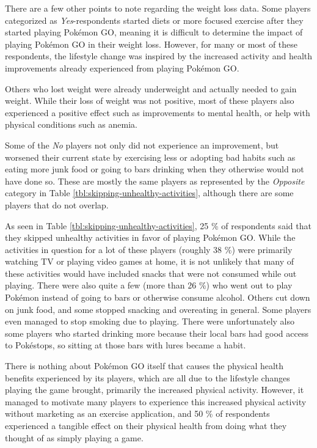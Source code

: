 There are a few other points to note regarding the weight loss data. Some players categorized as \emph{Yes}-respondents started diets or more focused exercise after they started playing Pokémon GO, meaning it is difficult to determine the impact of playing Pokémon GO in their weight loss. However, for many or most of these respondents, the lifestyle change was inspired by the increased activity and health improvements already experienced from playing Pokémon GO.

Others who lost weight were already underweight and actually needed to gain weight. While their loss of weight was not positive, most of these players also experienced a positive effect such as improvements to mental health, or help with physical conditions such as anemia.

Some of the \emph{No} players not only did not experience an improvement, but worsened their current state by exercising less or adopting bad habits such as eating more junk food or going to bars drinking when they otherwise would not have done so. These are mostly the same players as represented by the \emph{Opposite} category in Table \ref{tbl:skipping-unhealthy-activities}, although there are some players that do not overlap.

As seen in Table \ref{tbl:skipping-unhealthy-activities}, 25 \% of respondents said that they skipped unhealthy activities in favor of playing Pokémon GO. While the activities in question for a lot of these players (roughly 38 \%) were primarily watching TV or playing video games at home, it is not unlikely that many of these activities would have included snacks that were not consumed while out playing. There were also quite a few (more than 26 \%) who went out to play Pokémon instead of going to bars or otherwise consume alcohol. Others cut down on junk food, and some stopped snacking and overeating in general. Some players even managed to stop smoking due to playing. There were unfortunately also some players who started drinking more because their local bars had good access to Pokéstops, so sitting at those bars with lures became a habit.

There is nothing about Pokémon GO itself that causes the physical health benefits experienced by its players, which are all due to the lifestyle changes playing the game brought, primarily the increased physical activity. However, it managed to motivate many players to experience this increased physical activity without marketing as an exercise application, and 50 \% of respondents experienced a tangible effect on their physical health from doing what they thought of as simply playing a game.


